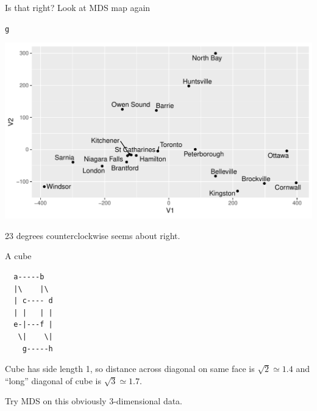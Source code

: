 \documentclass[unknownkeysallowed]{beamer}\usepackage[]{graphicx}\usepackage[]{color}
\makeatletter
\def\maxwidth{ %
  \ifdim\Gin@nat@width>\linewidth
    \linewidth
  \else
    \Gin@nat@width
  \fi
}
\newcommand{\hlstd}[1]{\textcolor[rgb]{0.345,0.345,0.345}{#1}}%
\newenvironment{kframe}{%
 \def\at@end@of@kframe{}%
 \ifinner\ifhmode%
  \def\at@end@of@kframe{\end{minipage}}%
  \begin{minipage}{\columnwidth}%
 \fi\fi%
 \def\FrameCommand##1{\hskip\@totalleftmargin \hskip-\fboxsep
 \colorbox{shadecolor}{##1}\hskip-\fboxsep
     \hskip-\linewidth \hskip-\@totalleftmargin \hskip\columnwidth}%
 \MakeFramed {\advance\hsize-\width
   \@totalleftmargin\z@ \linewidth\hsize
   \@setminipage}}%
 {\par\unskip\endMakeFramed%
 \at@end@of@kframe}
\newenvironment{knitrout}{}{} %
\makeatother
\begin{document}
\begin{frame}[fragile]{Is that right? Look at MDS map again}
  
\begin{knitrout}
\color{fgcolor}\begin{kframe}
\begin{alltt}
\hlstd{g}
\end{alltt}
\end{kframe}
\includegraphics[width=\maxwidth]{figure/unnamed-chunk-429-1} 

\end{knitrout}

23 degrees counterclockwise seems about right.
  
\end{frame}

\begin{frame}[fragile]{A cube}
  
  
\begin{verbatim}
  a-----b
  |\    |\
  | c---- d
  | |   | |
  e-|---f |
   \|    \|
    g-----h
\end{verbatim}

Cube has side length 1, so distance across diagonal on same face is $\sqrt{2}\simeq 1.4$ and ``long'' diagonal of cube is $\sqrt{3}\simeq 1.7$. 
  
\vspace{3ex}

Try MDS on this obviously 3-dimensional data.

\end{frame}
\end{document}
